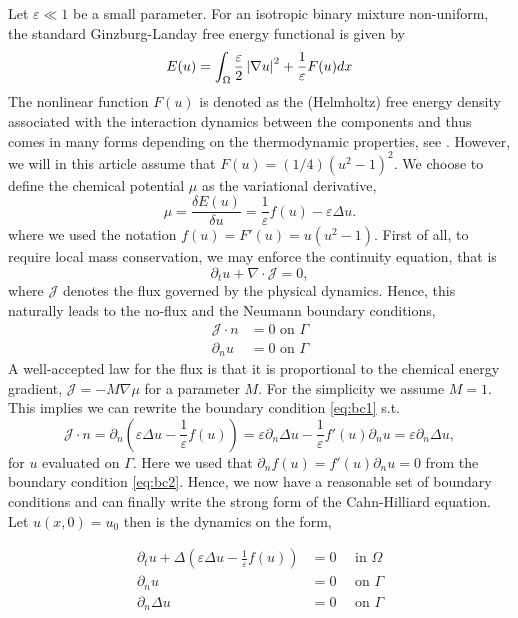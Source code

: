 Let $\varepsilon \ll 1 $ be a small parameter. For an isotropic
binary mixture non-uniform, the standard Ginzburg-Landay free energy functional is given by \[
E( u)  = \int_{\Omega }^{} \frac{\varepsilon }{2} \left\lvert  \nabla u  \right\rvert ^2 + \frac{1}{\varepsilon } F( u) dx
\]
The nonlinear function $F( u) $ is denoted as the (Helmholtz) free energy density associated with the interaction dynamics between the components and thus comes in many forms depending on the thermodynamic properties, see \cite{miranville2017cahn}.
However, we will in this article assume that $F( u) = ( 1 / 4 ) ( u^2 -1 ) ^{2} $.
We choose to define the chemical potential $\mu $ as the variational derivative,
\[
\mu = \frac{ \delta E( u) }{ \delta  u} = \frac{1}{\varepsilon }f( u)  - \varepsilon  \Delta u .
\]
where we used the notation $f( u) = F'( u) =u( u^2 -1)  $.
First of all, to require local mass conservation, we may enforce the continuity equation, that is \[
\partial _{t} u + \nabla \cdot \mathcal{J}  = 0,
\]
where $\mathcal{J} $ denotes the flux governed by the physical dynamics. Hence, this naturally leads to the no-flux and the Neumann boundary conditions,
\begin{align}
\label{eq:bc1}
\mathcal{J}  \cdot n & = 0 \text{ on } \Gamma \\
\label{eq:bc2}
\partial _{n} u & = 0 \text{ on } \Gamma
\end{align}
 A well-accepted law for the flux is that it is proportional to the chemical energy gradient, $\mathcal{J} = - M  \nabla \mu  $ for a parameter $M$. For the simplicity we assume $M=1$. This implies we can rewrite the boundary condition
 \eqref{eq:bc1} s.t. \[
\mathcal{J}  \cdot n  = \partial _{n} \left(  \varepsilon \Delta u - \frac{1}{\varepsilon }f( u)   \right)  = \varepsilon  \partial _{n} \Delta u - \frac{1}{\varepsilon } f' ( u) \partial _{n}u =  \varepsilon  \partial _{n} \Delta u    ,
 \]
 for $u$ evaluated on $\Gamma $. Here we used that $\partial _{n} f( u) = f' ( u) \partial _{n}u  = 0$ from the boundary condition \eqref{eq:bc2}.
 Hence, we now have a reasonable set of boundary conditions and can finally write the strong form of the Cahn-Hilliard equation. Let $ u( x,0) =  u_{0}$ then is the dynamics on the form,

\begin{equation}
\label{eq:strongch}
    \begin{split}
\partial _{t} u + \Delta  \left(  \varepsilon  \Delta u - \frac{1}{\varepsilon }f( u) \right)   &=0  \quad \text{ in } \Omega  \\
\partial _{n} u &= 0 \quad \text{ on } \Gamma  \\
\partial _{n}    \Delta u       &= 0 \quad \text{ on } \Gamma  \\
    \end{split}
\end{equation}

